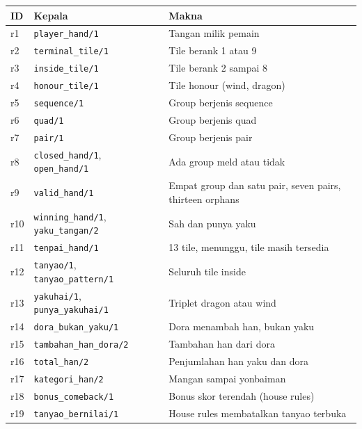 \documentclass[11pt,a4paper]{article}
\newcommand{\code}[1]{\texttt{#1}}
\begin{document}
\begin{longtable}{@{}p{1.1cm}p{5.6cm}p{7.8cm}@{}}
\toprule
ID & Kepala & Makna \\
\midrule
\endhead
r1 & \code{player_hand/1} & Tangan milik pemain \\
r2 & \code{terminal_tile/1} & Tile berank 1 atau 9 \\
r3 & \code{inside_tile/1} & Tile berank 2 sampai 8 \\
r4 & \code{honour_tile/1} & Tile honour (wind, dragon) \\
r5 & \code{sequence/1} & Group berjenis sequence \\
r6 & \code{quad/1} & Group berjenis quad \\
r7 & \code{pair/1} & Group berjenis pair \\
r8 & \code{closed_hand/1}, \code{open_hand/1} & Ada group meld atau tidak \\
r9 & \code{valid_hand/1} & Empat group dan satu pair, seven pairs, thirteen orphans \\
r10 & \code{winning_hand/1}, \code{yaku_tangan/2} & Sah dan punya yaku \\
r11 & \code{tenpai_hand/1} & 13 tile, menunggu, tile masih tersedia \\
r12 & \code{tanyao/1}, \code{tanyao_pattern/1} & Seluruh tile inside \\
r13 & \code{yakuhai/1}, \code{punya_yakuhai/1} & Triplet dragon atau wind \\
r14 & \code{dora_bukan_yaku/1} & Dora menambah han, bukan yaku \\
r15 & \code{tambahan_han_dora/2} & Tambahan han dari dora \\
r16 & \code{total_han/2} & Penjumlahan han yaku dan dora \\
r17 & \code{kategori_han/2} & Mangan sampai yonbaiman \\
r18 & \code{bonus_comeback/1} & Bonus skor terendah (house rules) \\
r19 & \code{tanyao_bernilai/1} & House rules membatalkan tanyao terbuka \\
\bottomrule
\end{longtable}
\end{document}
